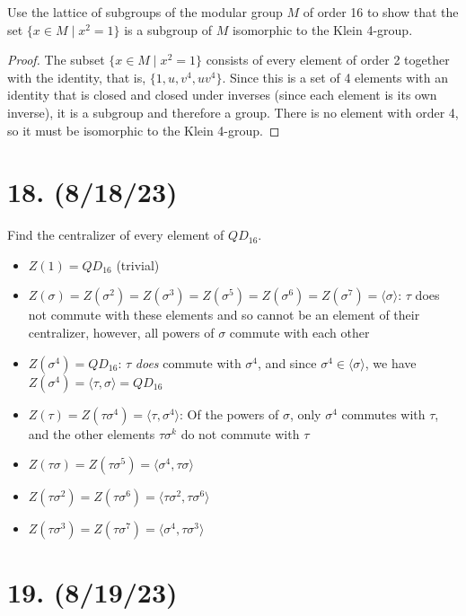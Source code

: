 \documentclass{article}
\begin{document}
Use the lattice of subgroups of the modular group $M$ of order 16 to show that the set $\{ x \in M \mid x^2 = 1 \}$ is a subgroup of $M$ isomorphic to the Klein 4-group.

\begin{proof}
    The subset $\{ x \in M \mid x^2 = 1 \}$ consists of every element of order 2 together with the identity, that is, $\{ 1, u, v^4, uv^4 \}$. Since this is a set of 4 elements with an identity that is closed and closed under inverses (since each element is its own inverse), it is a subgroup and therefore a group. There is no element with order 4, so it must be isomorphic to the Klein 4-group.
\end{proof}

\section*{18. (8/18/23)}

Find the centralizer of every element of $QD_{16}$.

\begin{itemize}[itemsep=0em]
    \item $Z(1) = QD_{16}$ (trivial)
    \item $Z(\sigma) = Z(\sigma^2) = Z(\sigma^3) = Z(\sigma^5) = Z(\sigma^6) = Z(\sigma^7) = \langle \sigma \rangle$: $\tau$ does not commute with these elements and so cannot be an element of their centralizer, however, all powers of $\sigma$ commute with each other
    \item $Z(\sigma^4) = QD_{16}$: $\tau$ \emph{does} commute with $\sigma^4$, and since $\sigma^4 \in \langle \sigma \rangle$, we have $Z(\sigma^4) = \langle \tau, \sigma \rangle = QD_{16}$
    \item $Z(\tau) = Z(\tau \sigma^4) = \langle \tau, \sigma^4 \rangle$: Of the powers of $\sigma$, only $\sigma^4$ commutes with $\tau$, and the other elements $\tau \sigma^k$ do not commute with $\tau$
    \item $Z(\tau \sigma) = Z(\tau \sigma^5) = \langle \sigma^4, \tau \sigma \rangle$
    \item $Z(\tau \sigma^2) = Z(\tau \sigma^6) = \langle \tau \sigma^2, \tau \sigma^6 \rangle$
    \item $Z(\tau \sigma^3) = Z(\tau \sigma^7) = \langle \sigma^4, \tau \sigma^3 \rangle$
\end{itemize}

\section*{19. (8/19/23)}
\end{document}
